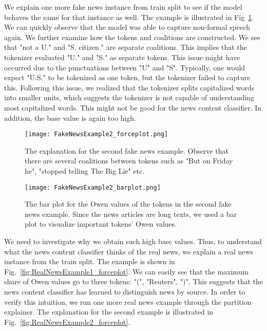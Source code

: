 We explain one more fake news instance from train split to see if the model behaves the same for that instance as well. The example is illustrated in Fig~\ref{fig:FakeNewsExample2_forceplot}. We can quickly observe that the model was able to capture non-formal speech again. We further examine how the tokens and coalitions are constructed. We see that "not a U." and "S. citizen." are separate coalitions. This implies that the tokenizer evaluated "U." and "S." as separate tokens. This issue might have occurred due to the punctuations between "U" and "S". Typically, one would expect "U.S." to be tokenized as one token, but the tokenizer failed to capture this. Following this issue, we realized that the tokenizer splits capitalized words into smaller units, which suggests the tokenizer is not capable of understanding most capitalized words. This might not be good for the news content classifier. In addition, the base value is again too high.\\
\begin{figure}
    \centering
    \texttt{[image: FakeNewsExample2\_forceplot.png]}
    \caption[The explanation for the second fake news example.]{The explanation for the second fake news example. Observe that there are several coalitions between tokens such as "But on Friday he", "stopped telling The Big Lie" etc.}
    \label{fig:FakeNewsExample2_forceplot}
\end{figure}
\begin{figure}
    \centering
    \texttt{[image: FakeNewsExample2\_barplot.png]}
    \caption[The bar plot for the Owen values of the tokens in the second fake news example.]{The bar plot for the Owen values of the tokens in the second fake news example.  Since the news articles are long texts, we used a bar plot to visualize important tokens' Owen values.}
\end{figure}
We need to investigate why we obtain such high base values. Thus, to understand what the news content classifier thinks of the real news, we explain a real news instance from the train split. The example is shown in Fig.~\ref{fig:RealNewsExample1_forceplot}. We can easily see that the maximum share of Owen values go to three tokens: "(", "Reuters", ")". This suggests that the news content classifier has learned to distinguish news by source. In order to verify this intuition, we run one more real news example through the partition explainer. The explanation for the second example is illustrated in Fig.~\ref{fig:RealNewsExample2_forceplot}.\\
